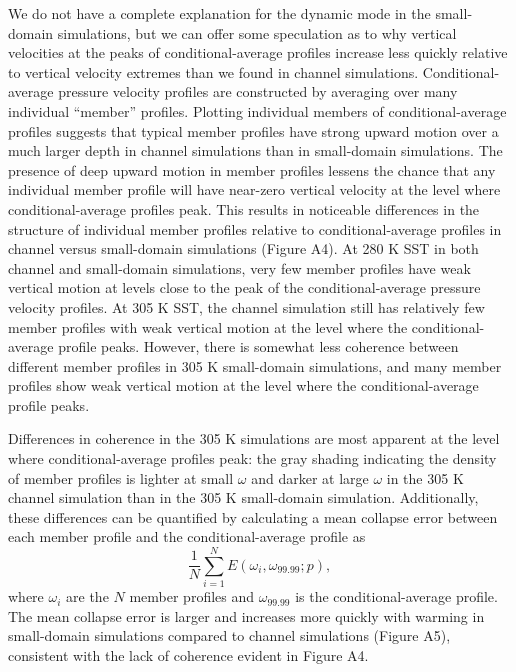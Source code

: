 \documentclass[twocol]{ametsoc}
\begin{document}
We do not have a complete explanation for the dynamic mode in the small-domain simulations, but we can offer some speculation as to why vertical velocities at the peaks of conditional-average profiles increase less quickly relative to vertical velocity extremes than we found in channel simulations. Conditional-average pressure velocity profiles are constructed by averaging over many individual ``member'' profiles. Plotting individual members of conditional-average profiles suggests that typical member profiles have strong upward motion over a much larger depth in channel simulations than in small-domain simulations. The presence of deep upward motion in member profiles lessens the chance that any individual member profile will have near-zero vertical velocity at the level where conditional-average profiles peak. This results in noticeable differences in the structure of individual member profiles relative to conditional-average profiles in channel versus small-domain simulations (Figure A4). At 280 K SST in both channel and small-domain simulations, very few member profiles have weak vertical motion at levels close to the peak of the conditional-average pressure velocity profiles. At 305 K SST, the channel simulation still has relatively few member profiles with weak vertical motion at the level where the conditional-average profile peaks. However, there is somewhat less coherence between different member profiles in 305 K small-domain simulations, and many member profiles show weak vertical motion at the level where the conditional-average profile peaks. 

Differences in coherence in the 305 K simulations are most apparent at the level where conditional-average profiles peak: the gray shading indicating the density of member profiles is lighter at small $\omega$ and darker at large $\omega$ in the 305 K channel simulation than in the 305 K small-domain simulation. Additionally, these differences can be quantified by calculating a mean collapse error between each member profile and the conditional-average profile as
\begin{equation}
\frac{1}{N} \sum_{i = 1}^{N} E(\omega_i, \omega_{99.99}; p),
\end{equation}
where $\omega_i$ are the $N$ member profiles and $\omega_{99.99}$ is the conditional-average profile. The mean collapse error is larger and increases more quickly with warming in small-domain simulations compared to channel simulations (Figure A5), consistent with the lack of coherence evident in Figure A4.
\end{document}
